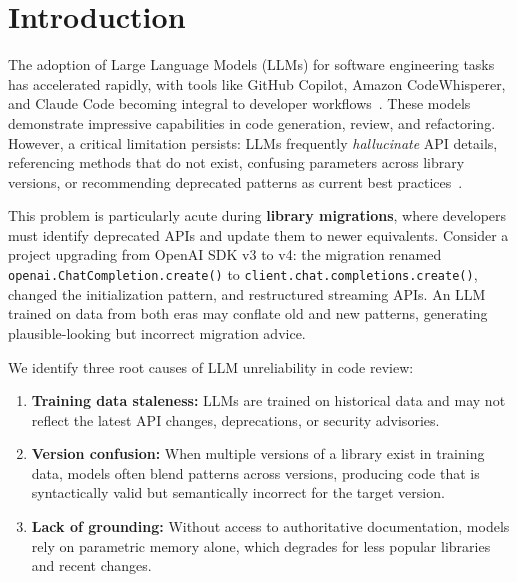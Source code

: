 \documentclass[sigconf,nonacm]{acmart}
\begin{document}

\maketitle

\section{Introduction}
\label{sec:intro}

The adoption of Large Language Models (LLMs) for software engineering tasks has accelerated rapidly, with tools like GitHub Copilot, Amazon CodeWhisperer, and Claude Code becoming integral to developer workflows~\cite{copilot2023,chen2021codex}. These models demonstrate impressive capabilities in code generation, review, and refactoring. However, a critical limitation persists: LLMs frequently \emph{hallucinate} API details, referencing methods that do not exist, confusing parameters across library versions, or recommending deprecated patterns as current best practices~\cite{liu2024hallucination,jesse2023hallucination}.

This problem is particularly acute during \textbf{library migrations}, where developers must identify deprecated APIs and update them to newer equivalents. Consider a project upgrading from OpenAI SDK v3 to v4: the migration renamed \texttt{openai.ChatCompletion.create()} to \texttt{client.chat.completions.create()}, changed the initialization pattern, and restructured streaming APIs. An LLM trained on data from both eras may conflate old and new patterns, generating plausible-looking but incorrect migration advice.

We identify three root causes of LLM unreliability in code review:

\begin{enumerate}
    \item \textbf{Training data staleness:} LLMs are trained on historical data and may not reflect the latest API changes, deprecations, or security advisories.
    \item \textbf{Version confusion:} When multiple versions of a library exist in training data, models often blend patterns across versions, producing code that is syntactically valid but semantically incorrect for the target version.
    \item \textbf{Lack of grounding:} Without access to authoritative documentation, models rely on parametric memory alone, which degrades for less popular libraries and recent changes.
\end{enumerate}
\end{document}

